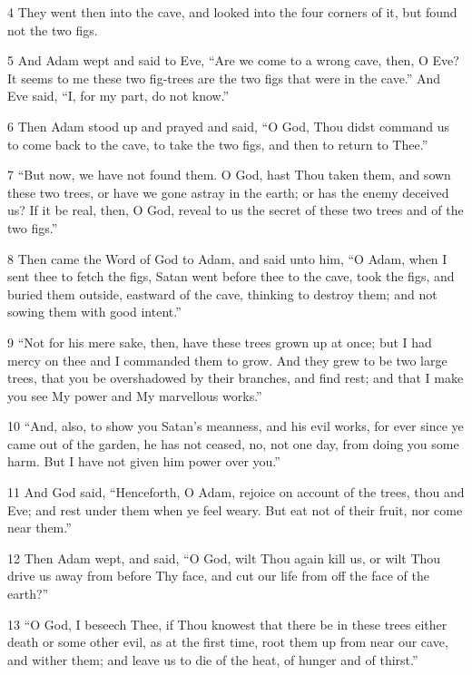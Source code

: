 \par 4 They went then into the cave, and looked into the four corners of it, but found not the two figs.

\par 5 And Adam wept and said to Eve, “Are we come to a wrong cave, then, O Eve? It seems to me these two fig-trees are the two figs that were in the cave.” And Eve said, “I, for my part, do not know.”

\par 6 Then Adam stood up and prayed and said, “O God, Thou didst command us to come back to the cave, to take the two figs, and then to return to Thee.”

\par 7 “But now, we have not found them. O God, hast Thou taken them, and sown these two trees, or have we gone astray in the earth; or has the enemy deceived us? If it be real, then, O God, reveal to us the secret of these two trees and of the two figs.”

\par 8 Then came the Word of God to Adam, and said unto him, “O Adam, when I sent thee to fetch the figs, Satan went before thee to the cave, took the figs, and buried them outside, eastward of the cave, thinking to destroy them; and not sowing them with good intent.”

\par 9 “Not for his mere sake, then, have these trees grown up at once; but I had mercy on thee and I commanded them to grow. And they grew to be two large trees, that you be overshadowed by their branches, and find rest; and that I make you see My power and My marvellous works.”

\par 10 “And, also, to show you Satan's meanness, and his evil works, for ever since ye came out of the garden, he has not ceased, no, not one day, from doing you some harm. But I have not given him power over you.”

\par 11 And God said, “Henceforth, O Adam, rejoice on account of the trees, thou and Eve; and rest under them when ye feel weary. But eat not of their fruit, nor come near them.”

\par 12 Then Adam wept, and said, “O God, wilt Thou again kill us, or wilt Thou drive us away from before Thy face, and cut our life from off the face of the earth?”

\par 13 “O God, I beseech Thee, if Thou knowest that there be in these trees either death or some other evil, as at the first time, root them up from near our cave, and wither them; and leave us to die of the heat, of hunger and of thirst.”

